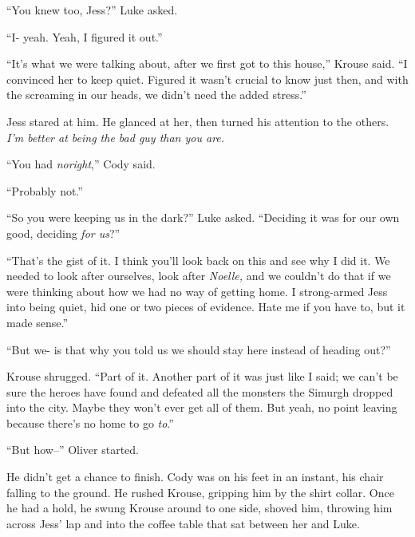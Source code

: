``You knew too, Jess?'' Luke asked.



``I- yeah.  Yeah, I figured it out.''



``It's what we were talking about, after we first got to this house,'' Krouse said.  ``I convinced her to keep quiet.  Figured it wasn't crucial to know just then, and with the screaming in our heads, we didn't need the added stress.''



Jess stared at him.  He glanced at her, then turned his attention to the others.  \emph{I'm better at being the bad guy than you are.}



``You had \emph{no}\emph{right},'' Cody said.



``Probably not.''



``So you were keeping us in the dark?'' Luke asked.  ``Deciding it was for our own good, deciding \emph{for us}?''



``That's the gist of it.  I think you'll look back on this and see why I did it.  We needed to look after ourselves, look after \emph{Noelle, }and we couldn't do that if we were thinking about how we had no way of getting home.  I strong-armed Jess into being quiet, hid one or two pieces of evidence.  Hate me if you have to, but it made sense.''



``But we- is that why you told us we should stay here instead of heading out?''



Krouse shrugged. ``Part of it.  Another part of it was just like I said; we can't be sure the heroes have found and defeated all the monsters the Simurgh dropped into the city.  Maybe they won't ever get all of them.  But yeah, no point leaving because there's no home to go \emph{to}.''



``But how--'' Oliver started.



He didn't get a chance to finish.  Cody was on his feet in an instant, his chair falling to the ground.  He rushed Krouse, gripping him by the shirt collar.  Once he had a hold, he swung Krouse around to one side, shoved him, throwing him across Jess' lap and into the coffee table that sat between her and Luke.



